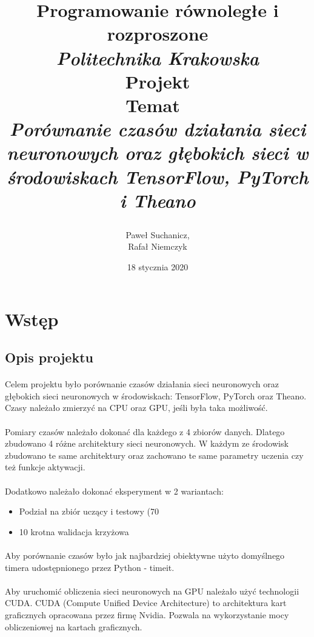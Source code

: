 \documentclass[a4paper,11pt]{article}
\title{
	\date{18 stycznia 2020}
	\textbf{Programowanie równoległe i rozproszone}\vspace{40pt}
	\\\textit{Politechnika Krakowska} \\\vspace{40pt}
	\textup{Projekt}\vspace{25pt}
	\\\textup{Temat}\
	\\\textit{Porównanie czasów działania sieci neuronowych oraz głębokich sieci w środowiskach TensorFlow, PyTorch i Theano} \\\vspace{26pt}
	\vspace{270pt}
}
\author{
	Paweł Suchanicz,\\
	Rafał Niemczyk
}
\begin{document}
\begin{titlepage}
\maketitle
\end{titlepage}

\begin{center}
\tableofcontents
\end{center}
\newpage
\section{Wstęp}
\subsection{Opis projektu}
\paragraph{}Celem projektu było porównanie czasów działania sieci neuronowych oraz głębokich sieci neuronowych w środowiskach: TensorFlow, PyTorch oraz Theano. Czasy należało zmierzyć na CPU oraz GPU, jeśli była taka możliwość. 
\paragraph{}Pomiary czasów należało dokonać dla każdego z 4 zbiorów danych. Dlatego zbudowano 4 różne architektury sieci neuronowych. W każdym ze środowisk zbudowano te same architektury oraz zachowano te same parametry uczenia czy też funkcje aktywacji.
\paragraph{}Dodatkowo należało dokonać eksperyment w 2 wariantach:
\begin{itemize}
\item Podział na zbiór uczący i testowy (70%
\item 10 krotna walidacja krzyżowa
\end{itemize}
\paragraph{}Aby porównanie czasów było jak najbardziej obiektywne użyto domyślnego timera udostępnionego przez Python - timeit.
\paragraph{}Aby uruchomić obliczenia sieci neuronowych na GPU należało użyć technologii CUDA. CUDA (Compute Unified Device Architecture) to architektura kart graficznych opracowana przez firmę Nvidia. Pozwala na wykorzystanie mocy obliczeniowej na kartach graficznych.
\end{document}
